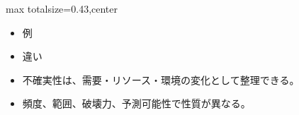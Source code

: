 \clearpage
{}
\begin{minipage}[t]{0.405\textwidth}
\begin{adjustbox}{max totalsize={\textwidth}{0.43\textheight},center}
\begin{minipage}{\textwidth}\scriptsize
{}\begin{itemize}
\item 例
\item 違い
\end{itemize}\begin{itemize}
\item 不確実性は、需要・リソース・環境の変化として整理できる。
\item 頻度、範囲、破壊力、予測可能性で性質が異なる。
\end{itemize}
\end{minipage}
\end{adjustbox}
\end{minipage}\hfill

